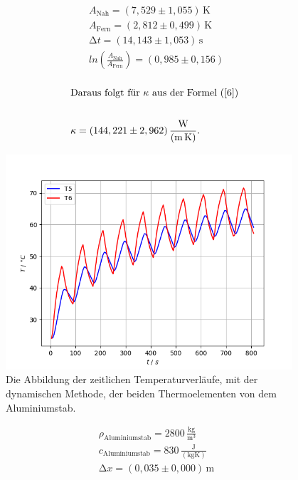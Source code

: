 \begin{align*}
    A_{\text{Nah}} = (7,529 \pm 1,055)\,\unit{\kelvin}\\
    A_{\text{Fern}} = (2,812 \pm 0,499)\,\unit{\kelvin}\\
    \increment t = (14,143 \pm 1,053)\,\unit{\second}\\
    ln\left(\frac{A_{\text{Nah}}}{A_{\text{Fern}}}\right) = (0,985 \pm 0,156)\\
\end{align*}

\begin{align*}
    \intertext{Daraus folgt für $\kappa$ aus der Formel (\ref{6}) }\\
    \kappa = (144,221 \pm 2,962)\,\frac{\unit{\watt}}{(\unit{\meter\kelvin})}.\\
\end{align*}

\begin{figure}[H]
   \centering
    \includegraphics[height=80mm]{bilder/TemprVerlDyT5T6.png}
    \caption{Die Abbildung der zeitlichen Temperaturverläufe, mit der dynamischen Methode, der beiden Thermoelementen von dem Aluminiumstab.\label{Abbildung7} }
\end{figure}

\begin{align*}
    \rho_{\text{Aluminiumstab}} = 2800\,\frac{\unit{\kilo\gram}}{\unit{\meter^3}}\\
    c_{\text{Aluminiumstab}} = 830\, \frac{\unit{\joule}}{(\unit{\kilo\gram\kelvin})} \\
    \increment x = (0,035 \pm 0,000)\,\unit{\meter}\\
\end{align*}

